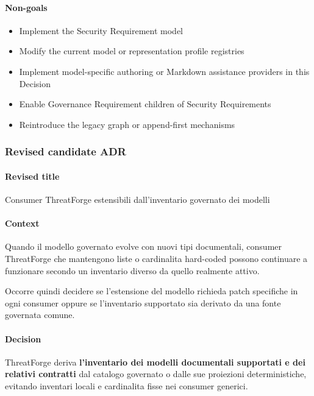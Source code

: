 \documentclass[
  10pt,
]{article}
\providecommand{\tightlist}{%
  \setlength{\itemsep}{0pt}\setlength{\parskip}{0pt}}
\begin{document}
\paragraph{Non-goals}\label{non-goals-7}

\begin{itemize}
\tightlist
\item
  Implement the Security Requirement model
\item
  Modify the current model or representation profile registries
\item
  Implement model-specific authoring or Markdown assistance providers in
  this Decision
\item
  Enable Governance Requirement children of Security Requirements
\item
  Reintroduce the legacy graph or append-first mechanisms
\end{itemize}

\subsubsection{Revised candidate ADR}\label{revised-candidate-adr-8}

\paragraph{Revised title}\label{revised-title-8}

Consumer ThreatForge estensibili dall'inventario governato dei modelli

\paragraph{Context}\label{context-17}

Quando il modello governato evolve con nuovi tipi documentali, consumer
ThreatForge che mantengono liste o cardinalita hard-coded possono
continuare a funzionare secondo un inventario diverso da quello
realmente attivo.

Occorre quindi decidere se l'estensione del modello richieda patch
specifiche in ogni consumer oppure se l'inventario supportato sia
derivato da una fonte governata comune.

\paragraph{Decision}\label{decision-17}

ThreatForge deriva \textbf{l'inventario dei modelli documentali
supportati e dei relativi contratti} dal catalogo governato o dalle sue
proiezioni deterministiche, evitando inventari locali e cardinalita
fisse nei consumer generici.
\end{document}
